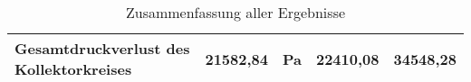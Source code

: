 \begin{table}[]
{\begin{tabular}{lclcc}
    \multicolumn{1}{|l|}{Gesamtdruckverlust des Kollektorkreises}                        & \multicolumn{1}{c|}{\cellcolor[HTML]{9AFF99}21582,84}      & \multicolumn{1}{l|}{\cellcolor[HTML]{9AFF99}Pa}               & \multicolumn{1}{c|}{22410,08}                 & \multicolumn{1}{c|}{34548,28}                 \\ \hline
    \end{tabular}%
    }
    \caption{Zusammenfassung aller Ergebnisse}
    \label{tab: Summary}
    \end{table}
    \newpage